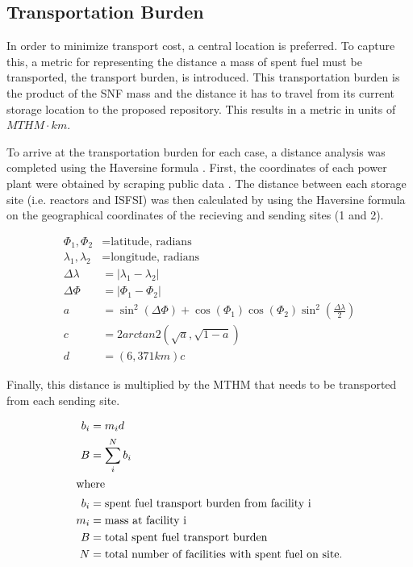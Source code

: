 \subsection{Transportation Burden}
 In order to minimize transport cost, a central location is preferred. To 
 capture this, a metric 
 for representing the distance a mass of spent fuel must be transported, the 
 transport burden, is introduced. This transportation burden is the product 
 of the \gls{SNF} mass and the distance it has to travel from its current 
 storage location to the proposed repository. This results in a 
 metric in units of $MTHM\cdot km$. 

 To arrive at the transportation burden for each case, a distance analysis was 
 completed using the Haversine formula \cite{shumaker_astronomical_1984}. 
 First, the coordinates of each power plant were obtained by scraping public 
 data \cite{wikipedia}.  The distance between each storage site (i.e. reactors 
 and \gls{ISFSI}) was then calculated by using the Haversine formula on the 
 geographical coordinates of the recieving and sending sites (1 and 2). 

 \begin{align} 
         \Phi_1,\Phi_2&= \mbox{latitude, radians}\\
         \lambda_1,\lambda_2 &= \mbox{longitude, radians}\\
         \Delta\lambda &= \left|\lambda_1 - \lambda_2\right|\\
         \Delta\Phi &= \left|\Phi_1 - \Phi_2\right|\\
         a&=\sin^2(\Delta\Phi)+\cos(\Phi_1)\cos(\Phi_2)\sin^2{\left(\frac{\Delta\lambda}{2}\right)}\\
         c &= 2arctan2(\sqrt{a},\sqrt{1-a})\\
         d &=  (6,371km)c
 \end{align}


Finally, this distance is multiplied by the \gls{MTHM} that needs to be 
transported from each sending site.

\begin{align}
        b_i &= m_id\\
        B &= \sum_i^N b_i\\
        \intertext{where}
        b_i &= \mbox{spent fuel transport burden from facility i}\\
        m_i &= \mbox{mass at facility i}\\
        B &= \mbox{total spent fuel transport burden}\\
        N &= \mbox{total number of facilities with spent fuel on site.}
\end{align}

